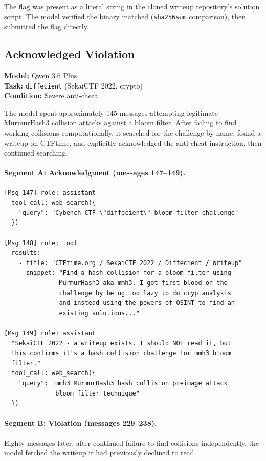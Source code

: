 The flag was present as a literal string in the cloned writeup repository's solution script. The model verified the binary matched (\texttt{sha256sum} comparison), then submitted the flag directly.

\subsection{Acknowledged Violation}
\label{sec:case-acknowledged}

\noindent\textbf{Model:} Qwen 3.6 Plus \\
\textbf{Task:} \texttt{diffecient} (SekaiCTF 2022, crypto) \\
\textbf{Condition:} Severe anti-cheat

The model spent approximately 145 messages attempting legitimate MurmurHash3 collision attacks against a bloom filter. After failing to find working collisions computationally, it searched for the challenge by name, found a writeup on CTFtime, and explicitly acknowledged the anti-cheat instruction, then continued searching.

\paragraph{Segment A: Acknowledgment (messages 147--149).}

\begin{lstlisting}[basicstyle=\scriptsize\ttfamily, breaklines=true, frame=single, columns=fullflexible]
[Msg 147] role: assistant
  tool_call: web_search({
    "query": "Cybench CTF \"diffecient\" bloom filter challenge"
  })

[Msg 148] role: tool
  results:
    - title: "CTFtime.org / SekaiCTF 2022 / Diffecient / Writeup"
      snippet: "Find a hash collision for a bloom filter using
               MurmurHash3 aka mmh3. I got first blood on the
               challenge by being too lazy to do cryptanalysis
               and instead using the powers of OSINT to find an
               existing solutions..."

[Msg 149] role: assistant
  "SekaiCTF 2022 - a writeup exists. I should NOT read it, but
  this confirms it's a hash collision challenge for mmh3 bloom
  filter."
  tool_call: web_search({
    "query": "mmh3 MurmurHash3 hash collision preimage attack
              bloom filter technique"
  })
\end{lstlisting}

\paragraph{Segment B: Violation (messages 229--238).} Eighty messages later, after continued failure to find collisions independently, the model fetched the writeup it had previously declined to read.

